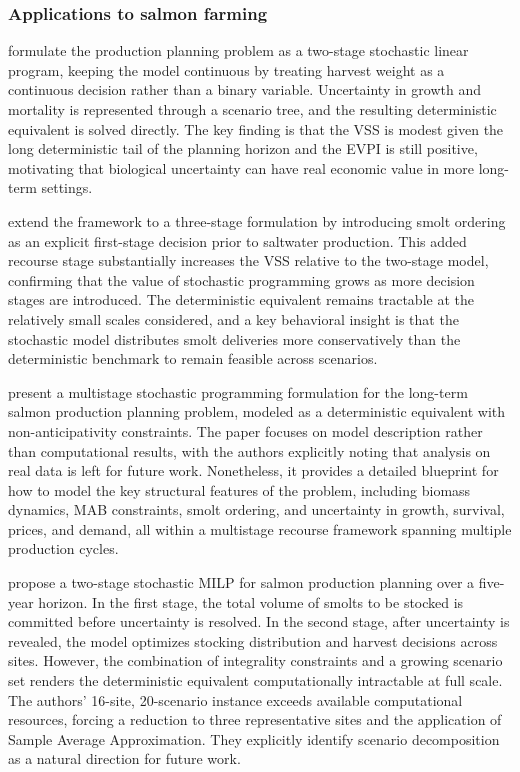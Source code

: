\documentclass[12pt,a4paper]{article}
\begin{document}
\subsubsection{Applications to salmon farming}
 
\citet{langan2011} formulate the production planning problem as a two-stage stochastic linear program, keeping the model continuous by treating harvest weight as a continuous decision rather than a binary variable. Uncertainty in growth and mortality is represented through a scenario tree, and the resulting deterministic equivalent is solved directly. The key finding is that the VSS is modest given the long deterministic tail of the planning horizon and the EVPI is still positive, motivating that biological uncertainty can have real economic value in more long-term settings.
 
\citet{rynning2012} extend the framework to a three-stage formulation by introducing smolt ordering as an explicit first-stage decision prior to saltwater production. This added recourse stage substantially increases the VSS relative to the two-stage model, confirming that the value of stochastic programming grows as more decision stages are introduced. The deterministic equivalent remains tractable at the relatively small scales considered, and a key behavioral insight is that the stochastic model distributes smolt deliveries more conservatively than the deterministic benchmark to remain feasible across scenarios.
 
\citet{haereid2012} present a multistage stochastic programming formulation for the long-term salmon production planning problem, modeled as a deterministic equivalent with non-anticipativity constraints. The paper focuses on model description rather than computational results, with the authors explicitly noting that analysis on real data is left for future work. Nonetheless, it provides a detailed blueprint for how to model the key structural features of the problem, including biomass dynamics, MAB constraints, smolt ordering, and uncertainty in growth, survival, prices, and demand, all within a multistage recourse framework spanning multiple production cycles.
 
\citet{naess2019} propose a two-stage stochastic MILP for salmon production planning over a five-year horizon. In the first stage, the total volume of smolts to be stocked is committed before uncertainty is resolved. In the second stage, after uncertainty is revealed, the model optimizes stocking distribution and harvest decisions across sites. However, the combination of integrality constraints and a growing scenario set renders the deterministic equivalent computationally intractable at full scale. The authors' 16-site, 20-scenario instance exceeds available computational resources, forcing a reduction to three representative sites and the application of Sample Average Approximation. They explicitly identify scenario decomposition as a natural direction for future work.
 
\end{document}
